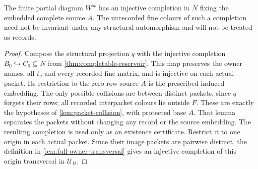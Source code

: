 \begin{lemma}
\label{lem:R07-W-completable}
The finite partial diagram $W^\#$ has an injective completion
in $N$ fixing the embedded complete source $A$.  The unrecorded
fine colours of such a completion need not be invariant under
any structural automorphism and will not be treated as records.
\end{lemma}
\begin{proof}
Compose the structural projection $q$ with the injective completion
$B_0\hookrightarrow C_0\subseteq N$ from
\cref{thm:completable-reservoir}. This map preserves the owner names,
all $t_g$ and every recorded fine matrix, and is injective on each
actual packet. Its restriction to the zero-row source $A$ is the
prescribed induced embedding. The only possible collisions are
between distinct packets, since $q$ forgets their rows; all recorded
interpacket colours lie outside $F$.
These are exactly the hypotheses of \cref{lem:packet-collision},
with protected base $A$. That lemma separates the packets without
changing any record or the source embedding. The resulting completion
is used only as an existence certificate. Restrict it to one origin in each
actual packet. Since their image packets are pairwise distinct, the definition
in \cref{lem:full-owner-transversal} gives an injective completion of this
origin transversal in $\mathcal U_B$.
\end{proof}

